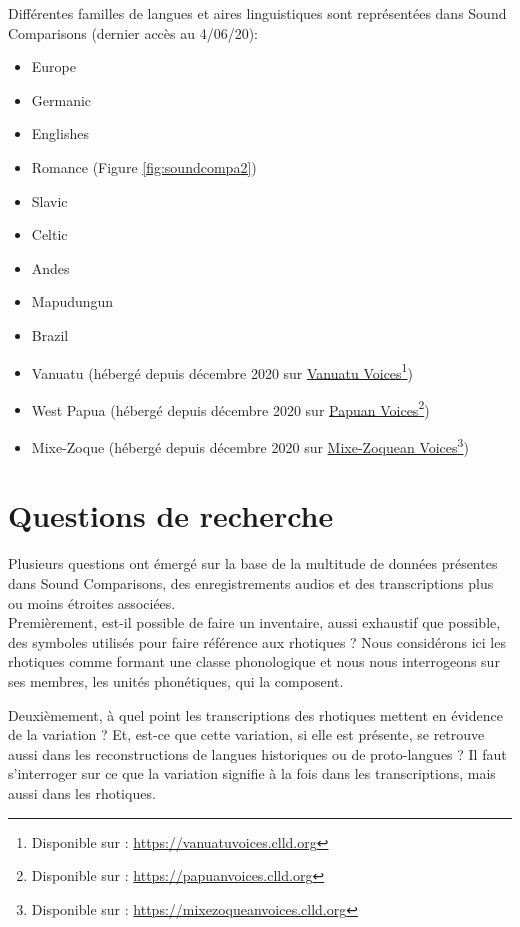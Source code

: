 Différentes familles de langues et aires linguistiques sont représentées dans Sound Comparisons (dernier accès au 4/06/20):

\begin{itemize}
	\item Europe
	\item Germanic
	\item Englishes
	\item Romance (Figure \ref{fig:soundcompa2})
	\item Slavic
	\item Celtic
	\item Andes
	\item Mapudungun
	\item Brazil
	\item Vanuatu (hébergé depuis décembre 2020 sur \href{https://vanuatuvoices.clld.org/}{Vanuatu Voices}\footnote{Disponible sur : \url{https://vanuatuvoices.clld.org}})
	\item West Papua (hébergé depuis décembre 2020 sur \href{https://papuanvoices.clld.org/}{Papuan Voices}\footnote{Disponible sur : \url{https://papuanvoices.clld.org}})
	\item Mixe-Zoque (hébergé depuis décembre 2020 sur \href{https://mixezoqueanvoices.clld.org/}{Mixe-Zoquean Voices}\footnote{Disponible sur : \url{https://mixezoqueanvoices.clld.org}})
\end{itemize}

\section{Questions de recherche}

Plusieurs questions ont émergé sur la base de la multitude de données présentes dans Sound Comparisons, des enregistrements audios et des transcriptions plus ou moins étroites associées. \\

Premièrement, est-il possible de faire un inventaire, aussi exhaustif que possible, des symboles utilisés pour faire référence aux rhotiques ?
Nous considérons ici les rhotiques comme formant une classe phonologique et nous nous interrogeons sur ses membres, les unités phonétiques, qui la composent.

Deuxièmement, à quel point les transcriptions des rhotiques mettent en évidence de la variation ? Et, est-ce que cette variation, si elle est présente, se retrouve aussi dans les reconstructions de langues historiques ou de proto-langues ?
Il faut s'interroger sur ce que la variation signifie à la fois dans les transcriptions, mais aussi dans les rhotiques.\\

